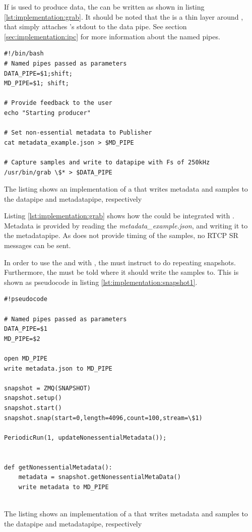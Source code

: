 If  is used to produce data, the \con{} can be written as shown in listing \ref{lst:implementation:grab}. It should be noted that the \pro{} is a thin layer around , that simply attaches 's stdout to the data pipe. See section \ref{sec:implementation:ipc} for more information about the named pipes.

\begin{listing}[H] 
\begin{verbatim}
#!/bin/bash
# Named pipes passed as parameters
DATA_PIPE=$1;shift;
MD_PIPE=$1; shift;

# Provide feedback to the user
echo "Starting producer"

# Set non-essential metadata to Publisher
cat metadata_example.json > $MD_PIPE

# Capture samples and write to datapipe with Fs of 250kHz
/usr/bin/grab \$* > $DATA_PIPE
\end{verbatim}
\caption{The listing shows an implementation of a \pro{} that writes metadata and samples to the datapipe and metadatapipe, respectively}
\label{lst:implementation:grab}
\end{listing}

\noindent{}Listing \ref{lst:implementation:grab} shows how the \pro{} could be integrated with .
Metadata is provided by reading the \textit{metadata\_example.json}, and writing it to the metadatapipe.
As  does not provide timing of the samples, no RTCP SR messages can be sent.


In order to use the \pub{} and \pub{} with , the \pro{} must instruct  to do repeating snapshots. Furthermore, the  must be told where it should write the samples to. This is shown as pseudocode in listing \ref{lst:implementation:snapshot1}.

\begin{listing}[H] 
\begin{verbatim}
#!pseudocode

# Named pipes passed as parameters
DATA_PIPE=$1
MD_PIPE=$2

open MD_PIPE
write metadata.json to MD_PIPE

snapshot = ZMQ(SNAPSHOT)
snapshot.setup()
snapshot.start()
snapshot.snap(start=0,length=4096,count=100,stream=\$1)

PeriodicRun(1, updateNonessentialMetadata());


def getNonessentialMetadata():
	metadata = snapshot.getNonessentialMetaData()
	write metadata to MD_PIPE
	
\end{verbatim}
\caption{The listing shows an implementation of a \pro{} that writes metadata and samples to the datapipe and metadatapipe, respectively}
\label{lst:implementation:snapshot1}
\end{listing}

